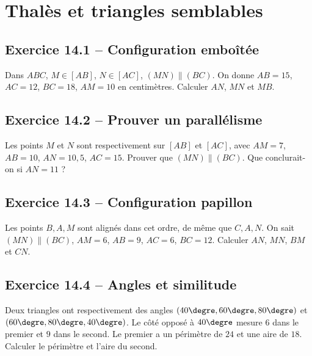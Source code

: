 \chapter{Thalès et triangles semblables}
\label{exercices:14}
\section*{Exercice 14.1 -- Configuration emboîtée}
Dans $ABC$, $M\in[AB]$, $N\in[AC]$, $(MN)\parallel(BC)$. On donne $AB=15$, $AC=12$, $BC=18$, $AM=10$ en centimètres. Calculer $AN$, $MN$ et $MB$.

\section*{Exercice 14.2 -- Prouver un parallélisme}
Les points $M$ et $N$ sont respectivement sur $[AB]$ et $[AC]$, avec $AM=7$, $AB=10$, $AN=10{,}5$, $AC=15$. Prouver que $(MN)\parallel(BC)$. Que conclurait-on si $AN=11$ ?

\section*{Exercice 14.3 -- Configuration papillon}
Les points $B,A,M$ sont alignés dans cet ordre, de même que $C,A,N$. On sait $(MN)\parallel(BC)$, $AM=6$, $AB=9$, $AC=6$, $BC=12$. Calculer $AN$, $MN$, $BM$ et $CN$.

\section*{Exercice 14.4 -- Angles et similitude}
Deux triangles ont respectivement des angles $(40\degre,60\degre,80\degre)$ et $(60\degre,80\degre,40\degre)$. Le côté opposé à $40\degre$ mesure $6$ dans le premier et $9$ dans le second. Le premier a un périmètre de $24$ et une aire de $18$. Calculer le périmètre et l'aire du second.
